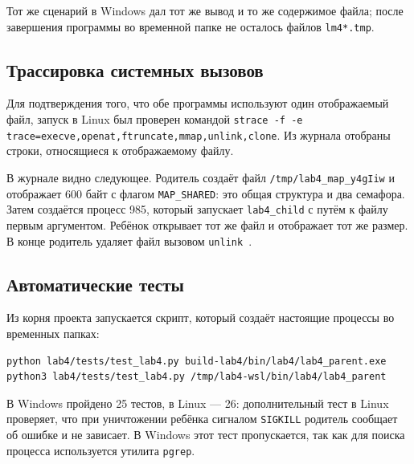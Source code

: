 

Тот же сценарий в Windows дал тот же вывод и то же содержимое файла; после завершения программы во временной папке не осталось файлов \texttt{lm4*.tmp}.



\subsection{Трассировка системных вызовов}
Для подтверждения того, что обе программы используют один отображаемый файл, запуск в Linux был проверен командой \texttt{strace -f -e trace=execve,openat,ftruncate,mmap,unlink,clone}. Из журнала отобраны строки, относящиеся к отображаемому файлу.



В журнале видно следующее. Родитель создаёт файл \texttt{/tmp/lab4\_map\_y4gIiw} и отображает 600 байт с флагом \texttt{MAP\_SHARED}: это общая структура и два семафора. Затем создаётся процесс 985, который запускает \texttt{lab4\_child} с путём к файлу первым аргументом. Ребёнок открывает тот же файл и отображает тот же размер. В конце родитель удаляет файл вызовом \texttt{unlink}~\cite{linuxmmap}.

\subsection{Автоматические тесты}
Из корня проекта запускается скрипт, который создаёт настоящие процессы во временных папках:
\begin{verbatim}
python lab4/tests/test_lab4.py build-lab4/bin/lab4/lab4_parent.exe
python3 lab4/tests/test_lab4.py /tmp/lab4-wsl/bin/lab4/lab4_parent
\end{verbatim}

В Windows пройдено 25 тестов, в Linux --- 26: дополнительный тест в Linux проверяет, что при уничтожении ребёнка сигналом \texttt{SIGKILL} родитель сообщает об ошибке и не зависает. В Windows этот тест пропускается, так как для поиска процесса используется утилита \texttt{pgrep}.

